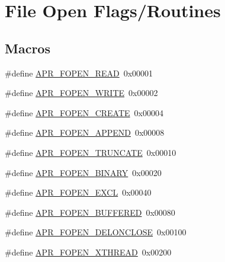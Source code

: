 \hypertarget{group__apr__file__open__flags}{}\section{File Open Flags/\+Routines}
\label{group__apr__file__open__flags}
\subsection*{Macros}
\begin{DoxyCompactItemize}
\item 
\#define \mbox{\hyperlink{group__apr__file__open__flags_gaf9e7303f028b130ff7d4b209d6662d7d}{A\+P\+R\+\_\+\+F\+O\+P\+E\+N\+\_\+\+R\+E\+AD}}~0x00001
\item 
\#define \mbox{\hyperlink{group__apr__file__open__flags_gac598bb95fc9476b0bf2ed0b1c308842c}{A\+P\+R\+\_\+\+F\+O\+P\+E\+N\+\_\+\+W\+R\+I\+TE}}~0x00002
\item 
\#define \mbox{\hyperlink{group__apr__file__open__flags_gafe94f21ccbf411172e70e7f473af251a}{A\+P\+R\+\_\+\+F\+O\+P\+E\+N\+\_\+\+C\+R\+E\+A\+TE}}~0x00004
\item 
\#define \mbox{\hyperlink{group__apr__file__open__flags_ga45f353db9b71d4760a3f35cf3781cfc8}{A\+P\+R\+\_\+\+F\+O\+P\+E\+N\+\_\+\+A\+P\+P\+E\+ND}}~0x00008
\item 
\#define \mbox{\hyperlink{group__apr__file__open__flags_ga09b05a5bd5db534b93794f7657bcb146}{A\+P\+R\+\_\+\+F\+O\+P\+E\+N\+\_\+\+T\+R\+U\+N\+C\+A\+TE}}~0x00010
\item 
\#define \mbox{\hyperlink{group__apr__file__open__flags_gacb20b3028864f34cb26314fe2cacc3fa}{A\+P\+R\+\_\+\+F\+O\+P\+E\+N\+\_\+\+B\+I\+N\+A\+RY}}~0x00020
\item 
\#define \mbox{\hyperlink{group__apr__file__open__flags_gabb7fb062cdf1d58faee8c7ea518496f1}{A\+P\+R\+\_\+\+F\+O\+P\+E\+N\+\_\+\+E\+X\+CL}}~0x00040
\item 
\#define \mbox{\hyperlink{group__apr__file__open__flags_gac48fd4c853c9f561632a2e8aaf5d8d97}{A\+P\+R\+\_\+\+F\+O\+P\+E\+N\+\_\+\+B\+U\+F\+F\+E\+R\+ED}}~0x00080
\item 
\#define \mbox{\hyperlink{group__apr__file__open__flags_ga5d3756f6d242c667ed1d3f54af4916eb}{A\+P\+R\+\_\+\+F\+O\+P\+E\+N\+\_\+\+D\+E\+L\+O\+N\+C\+L\+O\+SE}}~0x00100
\item 
\#define \mbox{\hyperlink{group__apr__file__open__flags_ga435cd9b2604b11796779c23ffa00a3dd}{A\+P\+R\+\_\+\+F\+O\+P\+E\+N\+\_\+\+X\+T\+H\+R\+E\+AD}}~0x00200

\end{DoxyCompactItemize}
